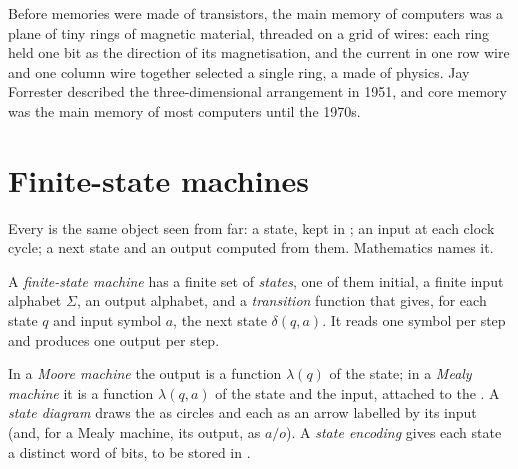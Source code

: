 \begin{history}
Before memories were made of transistors, the main memory of computers was a plane of tiny rings of magnetic material,
threaded on a grid of wires: each ring held one bit as the direction of its magnetisation, and the current in one row
wire and one column wire together selected a single ring, a  made of physics. Jay Forrester described the
three-dimensional arrangement in 1951, and core memory was the main memory of most computers until the 1970s.
\end{history}


\section{Finite-state machines}\label{sec:b1:sequential-circuits:fsm}

Every  is the same object seen from far: a state, kept in ; an input at each clock cycle;
a next state and an output computed from them. Mathematics names it.

\begin{definition}\label{def:b1:sequential-circuits:fsm}
A \emph{finite-state machine} has a finite set of \emph{states},
one of them initial, a finite input alphabet $\Sigma$, an output alphabet, and a \emph{transition}
function that gives, for each state $q$ and input symbol $a$, the next state $\delta(q, a)$. It reads one symbol per step
and produces one output per step.
\end{definition}

\begin{definition}\label{def:b1:sequential-circuits:moore-mealy}
In a \emph{Moore machine} the output is a function $\lambda(q)$ of the state; in a \emph{Mealy
machine} it is a function $\lambda(q, a)$ of the state and the input, attached to the . A
\emph{state diagram} draws the  as circles and each  as an arrow labelled by its
input (and, for a Mealy machine, its output, as $a/o$). A \emph{state encoding} gives each state a
distinct word of bits, to be stored in .
\end{definition}

